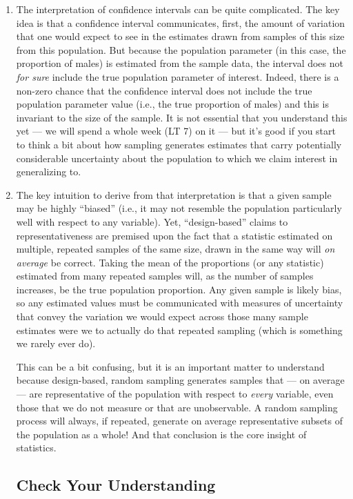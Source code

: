 \documentclass[a4paper,12pt]{article}
\begin{document}
\begin{enumerate}
\item The interpretation of confidence intervals can be quite complicated. The key idea is that a confidence interval communicates, first, the amount of variation that one would expect to see in the estimates drawn from samples of this size from this population. But because the population parameter (in this case, the proportion of males) is estimated from the sample data, the interval does not \textit{for sure} include the true population parameter of interest. Indeed, there is a non-zero chance that the confidence interval does not include the true population parameter value (i.e., the true proportion of males) and this is invariant to the size of the sample. It is not essential that you understand this yet --- we will spend a whole week (LT 7) on it --- but it's good if you start to think a bit about how sampling generates estimates that carry potentially considerable uncertainty about the population to which we claim interest in generalizing to.


\item The key intuition to derive from that interpretation is that a given sample may be highly ``biased'' (i.e., it may not resemble the population particularly well with respect to any variable). Yet, ``design-based'' claims to representativeness are premised upon the fact that a statistic estimated on multiple, repeated samples of the same size, drawn in the same way will \textit{on average} be correct. Taking the mean of the proportions (or any statistic) estimated from many repeated samples will, as the number of samples increases, be the true population proportion. Any given sample is likely bias, so any estimated values must be communicated with measures of uncertainty that convey the variation we would expect across those many sample estimates were we to actually do that repeated sampling (which is something we rarely ever do).

This can be a bit confusing, but it is an important matter to understand because design-based, random sampling generates samples that --- on average --- are representative of the population with respect to \textit{every} variable, even those that we do not measure or that are unobservable. A random sampling process will always, if repeated, generate on average representative subsets of the population as a whole! And that conclusion is the core insight of statistics.



\subsection{Check Your Understanding}


\end{enumerate}
\end{document}
